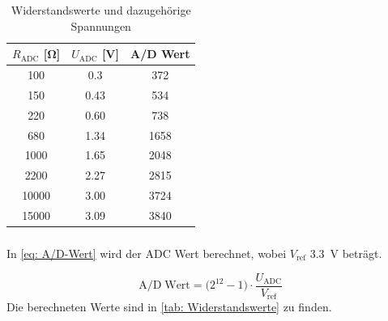 \begin{table}[htb]
    \centering
    \caption{Widerstandswerte und dazugehörige Spannungen}
    \label{tab: Widerstandswerte}
    \begin{tabular}{ccc}
        \toprule
        $R_{\text{ADC}}$ [\si{\ohm}]& $U_{\text{ADC}}$  [\si{\volt}] & A/D Wert \\
        \midrule
        \num{100} & \num{0.3} & \num{372} \\
        \num{150} & \num{0.43} & \num{534}\\
        \num{220} & \num{0.60} & \num{738}\\
		\num{680} & \num{1.34} & \num{1658}\\
		\num{1000} & \num{1.65} & \num{2048}\\
		\num{2200} & \num{2.27} & \num{2815}\\
		\num{10000} & \num{3.00} & \num{3724}\\
		\num{15000} & \num{3.09} & \num{3840}\\
        \bottomrule
    \end{tabular}
\end{table}

\subsubsection{}
In \autoref{eq: A/D-Wert} wird der ADC Wert berechnet, wobei $V_{\text{ref}}$  \SI{3.3}{\volt} beträgt.


\begin{equation}
\label{eq: ADC-Wert}
\text{A/D}\; \text{Wert}=\big(2^{12}-1\big)\cdot \frac{U_{\text{ADC}}}{V_{\text{ref}}}
\end{equation}
Die berechneten Werte sind in \autoref{tab: Widerstandswerte} zu finden.

